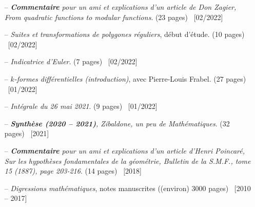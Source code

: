 \documentclass[10pt]{article}
\newcommand\tab[1][1cm]{\hspace*{#1}}
\begin{document}
\begin{itemize}[itemsep = -0.75 mm]
\begin{itemize}
	
	
	
				          \item[--] \noindent \textit{\textbf{Commentaire} pour un ami et explications d'un article de Don Zagier, From quadratic functions to modular functions}. (23 pages) \hfill {\ \small [02/2022]}
				          \item[--] \noindent \textit{Suites et transformations de polygones réguliers}, début d'étude. (10 pages) \hfill {\ \small [02/2022]}
				          \item[--] \noindent \textit{Indicatrice d'Euler}. (7 pages) \hfill {\ \small [02/2022]}
				          \item[--] \noindent \textit{$k$-formes différentielles (introduction)}, avec Pierre-Louis Frabel. (27 pages) \hfill {\ \small [01/2022]}
				          \item[--] \noindent \textit{Intégrale du 26 mai 2021}. (9 pages) \hfill {\ \small [01/2022]}
				          \item[--] \noindent \textit{\textbf{Synthèse (2020 -- 2021)}, Zibaldone, un peu de Mathématiques}. (32 pages)  \hfill {\ \small [2021]}
					      \item[--] \noindent \textit{\textbf{Commentaire} pour un ami et explications d'un article d'Henri Poincaré, \textit{Sur les hypothèses fondamentales de la géométrie}, Bulletin de la S.M.F., tome 15 (1887), page 203-216}. (14 pages)  \hfill {\ \small [2018]}	
						  \item[--] \noindent \textit{Digressions mathématiques}, notes manuscrites ((environ) 3000 pages) \hfill {\ \small [2010 -- 2017]}
				\end{itemize}
		\end{itemize}
\end{document}
